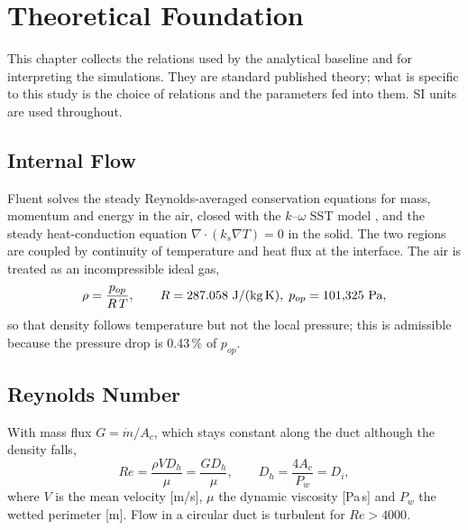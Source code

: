 \chapter{Theoretical Foundation}\label{ch:theory}
This chapter collects the relations used by the analytical baseline and for interpreting the simulations. They are standard published
theory; what is specific to this study is the choice of relations and the parameters fed into them. SI units are used throughout.

\section{Internal Flow}
Fluent solves the steady Reynolds-averaged conservation equations for mass, momentum and energy in the air, closed with the $k$--$\omega$
SST model \cite{menter1994}, and the steady heat-conduction equation $\nabla\cdot(k_s\nabla T) = 0$ in the solid. The two regions are
coupled by continuity of temperature and heat flux at the interface. The air is treated as an incompressible ideal gas,
\begin{equation}
\rho = \frac{p_{op}}{R\,T}, \qquad R = 287.058~\text{J/(kg\,K)},\; p_{op} = 101{,}325~\text{Pa},
\label{eq:idealgas}
\end{equation}
so that density follows temperature but not the local pressure; this is admissible because the pressure drop is 0.43\,\% of $p_{op}$.

\section{Reynolds Number}
With mass flux $G = \dot m/A_c$, which stays constant along the duct although the density falls,
\begin{equation}
Re = \frac{\rho V D_h}{\mu} = \frac{G D_h}{\mu}, \qquad D_h = \frac{4A_c}{P_w} = D_i ,
\label{eq:re}
\end{equation}
where $V$ is the mean velocity [m/s], $\mu$ the dynamic viscosity [Pa\,s] and $P_w$ the wetted perimeter [m]. Flow in a circular duct is
turbulent for $Re > 4000$.

